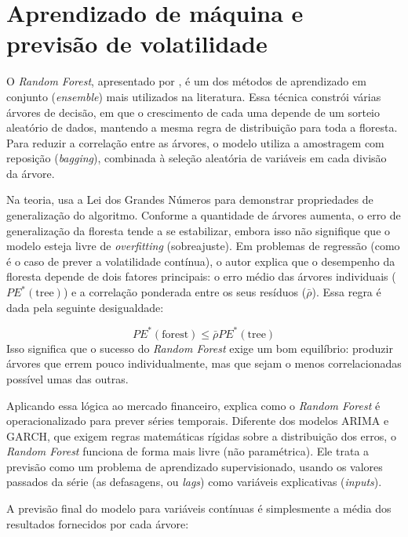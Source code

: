 \section{Aprendizado de máquina e previsão de volatilidade}
O \textit{Random Forest}, apresentado por \textcite{breiman2001random}, é um dos métodos de aprendizado em conjunto (\textit{ensemble}) mais utilizados na literatura. Essa técnica constrói várias árvores de decisão, em que o crescimento de cada uma depende de um sorteio aleatório 
de dados, mantendo a mesma regra de distribuição para toda a floresta. Para reduzir a correlação entre as árvores, o modelo utiliza a amostragem com reposição (\textit{bagging}), combinada à seleção aleatória de variáveis em cada divisão da árvore.

Na teoria, \textcite{breiman2001random} usa a Lei dos Grandes Números para demonstrar propriedades de generalização do algoritmo. Conforme a quantidade de árvores aumenta, o erro de generalização da floresta tende a se estabilizar, embora isso não signifique que o modelo esteja livre de \textit{overfitting} (sobreajuste). 
Em problemas de regressão (como é o caso de prever a volatilidade contínua), o autor explica que o desempenho da floresta depende de dois fatores principais: o erro médio das árvores individuais ($PE^*(\text{tree})$) e a correlação ponderada entre os seus resíduos 
($\bar{\rho}$). Essa regra é dada pela seguinte desigualdade:

\begin{equation}
    PE^*(\text{forest}) \le \bar{\rho} PE^*(\text{tree})
\end{equation}
Isso significa que o sucesso do \textit{Random Forest} exige um bom equilíbrio: produzir árvores que errem pouco individualmente, mas que sejam o menos correlacionadas possível umas das outras.

Aplicando essa lógica ao mercado financeiro, \textcite{amoanu2025comparative} explica como o \textit{Random Forest} é operacionalizado para prever séries temporais. Diferente dos modelos ARIMA e GARCH, que exigem 
regras matemáticas rígidas sobre a distribuição dos erros, o \textit{Random Forest} funciona de forma mais livre (não paramétrica). Ele trata a previsão como um problema de aprendizado supervisionado, 
usando os valores passados da série (as defasagens, ou \textit{lags}) como variáveis explicativas (\textit{inputs}).

A previsão final do modelo para variáveis contínuas é simplesmente a média dos resultados fornecidos por cada árvore:

